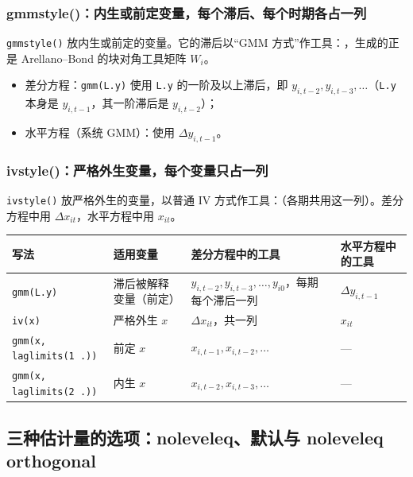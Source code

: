 \subsubsection{gmmstyle()：内生或前定变量，每个滞后、每个时期各占一列}

\texttt{gmmstyle()} 放内生或前定的变量。它的滞后以“GMM 方式”作工具：，生成的正是 Arellano--Bond 的块对角工具矩阵 $W_i$。
\begin{itemize}
  \item 差分方程：\texttt{gmm(L.y)} 使用 \texttt{L.y} 的一阶及以上滞后，即 $y_{i,t-2},y_{i,t-3},\dots$（\texttt{L.y} 本身是 $y_{i,t-1}$，其一阶滞后是 $y_{i,t-2}$）；
  \item 水平方程（系统 GMM）：使用 $\Delta y_{i,t-1}$。
\end{itemize}

\subsubsection{ivstyle()：严格外生变量，每个变量只占一列}

\texttt{ivstyle()} 放严格外生的变量，以普通 IV 方式作工具：（各期共用这一列）。差分方程中用 $\Delta x_{it}$，水平方程中用 $x_{it}$。

\begin{center}
\small
\begin{tabularx}{\linewidth}{lLLL}
\toprule
写法 & 适用变量 & 差分方程中的工具 & 水平方程中的工具\\
\midrule
\texttt{gmm(L.y)} & 滞后被解释变量（前定） & $y_{i,t-2},y_{i,t-3},\dots,y_{i0}$，每期每个滞后一列 & $\Delta y_{i,t-1}$\\
\texttt{iv(x)} & 严格外生 $x$ & $\Delta x_{it}$，共一列 & $x_{it}$\\
\texttt{gmm(x, laglimits(1 .))} & 前定 $x$ & $x_{i,t-1},x_{i,t-2},\dots$ & —\\
\texttt{gmm(x, laglimits(2 .))} & 内生 $x$ & $x_{i,t-2},x_{i,t-3},\dots$ & —\\
\bottomrule
\end{tabularx}
\label{tab:U12c-ivgmm}
\end{center}

\subsection{三种估计量的选项：noleveleq、默认与 noleveleq orthogonal}

